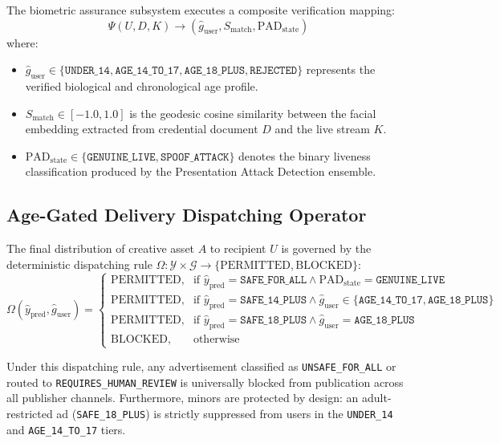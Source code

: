\documentclass[12pt,a4paper]{report}
\begin{document}
The biometric assurance subsystem executes a composite verification mapping:
\begin{equation}
\Psi(U, D, K) \longrightarrow \left( \hat{g}_{\text{user}}, S_{\text{match}}, \text{PAD}_{\text{state}} \right)
\end{equation}
where:
\begin{itemize}
    \item $\hat{g}_{\text{user}} \in \{\texttt{UNDER\_14}, \texttt{AGE\_14\_TO\_17}, \texttt{AGE\_18\_PLUS}, \texttt{REJECTED}\}$ represents the verified biological and chronological age profile.
    \item $S_{\text{match}} \in [-1.0, 1.0]$ is the geodesic cosine similarity between the facial embedding extracted from credential document $D$ and the live stream $K$.
    \item $\text{PAD}_{\text{state}} \in \{\texttt{GENUINE\_LIVE}, \texttt{SPOOF\_ATTACK}\}$ denotes the binary liveness classification produced by the Presentation Attack Detection ensemble.
\end{itemize}

\subsection{Age-Gated Delivery Dispatching Operator}
The final distribution of creative asset $A$ to recipient $U$ is governed by the deterministic dispatching rule $\Omega: \mathcal{Y} \times \mathcal{G} \rightarrow \{\text{PERMITTED}, \text{BLOCKED}\}$:
\begin{equation}
\Omega(\hat{y}_{\text{pred}}, \hat{g}_{\text{user}}) = 
\begin{cases}
\text{PERMITTED}, & \text{if } \hat{y}_{\text{pred}} = \texttt{SAFE\_FOR\_ALL} \land \text{PAD}_{\text{state}} = \texttt{GENUINE\_LIVE} \\
\text{PERMITTED}, & \text{if } \hat{y}_{\text{pred}} = \texttt{SAFE\_14\_PLUS} \land \hat{g}_{\text{user}} \in \{\texttt{AGE\_14\_TO\_17}, \texttt{AGE\_18\_PLUS}\} \\
\text{PERMITTED}, & \text{if } \hat{y}_{\text{pred}} = \texttt{SAFE\_18\_PLUS} \land \hat{g}_{\text{user}} = \texttt{AGE\_18\_PLUS} \\
\text{BLOCKED}, & \text{otherwise}
\end{cases}
\end{equation}

Under this dispatching rule, any advertisement classified as \texttt{UNSAFE\_FOR\_ALL} or routed to \texttt{REQUIRES\_HUMAN\_REVIEW} is universally blocked from publication across all publisher channels. Furthermore, minors are protected by design: an adult-restricted ad (\texttt{SAFE\_18\_PLUS}) is strictly suppressed from users in the \texttt{UNDER\_14} and \texttt{AGE\_14\_TO\_17} tiers.
\end{document}
